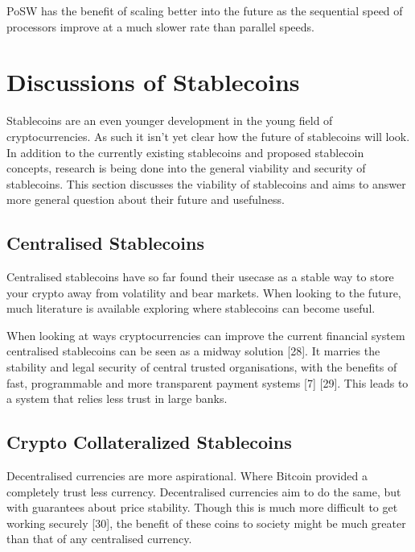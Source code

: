 \documentclass[english,]{IEEEtran}
\begin{document}
PoSW has the benefit of scaling better into the future as the sequential
speed of processors improve at a much slower rate than parallel speeds.

\section{Discussions of Stablecoins}\label{discussions-of-stablecoins}

Stablecoins are an even younger development in the young field of
cryptocurrencies. As such it isn't yet clear how the future of
stablecoins will look. In addition to the currently existing stablecoins
and proposed stablecoin concepts, research is being done into the
general viability and security of stablecoins. This section discusses
the viability of stablecoins and aims to answer more general question
about their future and usefulness.

\subsection{Centralised Stablecoins}\label{centralised-stablecoins}

Centralised stablecoins have so far found their usecase as a stable way
to store your crypto away from volatility and bear markets. When looking
to the future, much literature is available exploring where stablecoins
can become useful.

When looking at ways cryptocurrencies can improve the current financial
system centralised stablecoins can be seen as a midway solution
{[}28{]}. It marries the stability and legal security of central trusted
organisations, with the benefits of fast, programmable and more
transparent payment systems {[}7{]} {[}29{]}. This leads to a system
that relies less trust in large banks.

\subsection{Crypto Collateralized
Stablecoins}\label{crypto-collateralized-stablecoins-1}

Decentralised currencies are more aspirational. Where Bitcoin provided a
completely trust less currency. Decentralised currencies aim to do the
same, but with guarantees about price stability. Though this is much
more difficult to get working securely {[}30{]}, the benefit of these
coins to society might be much greater than that of any centralised
currency.
\end{document}
